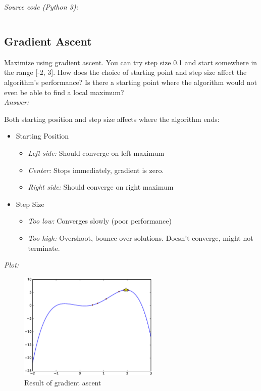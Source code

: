 \documentclass{article}           %
\newcommand\marginsymbol[1][0pt]{%
  \tabto*{0cm}\makebox[\dimexpr-1cm-#1\relax][r]{$\mathbb{P}$}\tabto*{\TabPrevPos}}
\begin{document}
\emph{Source code (Python 3):}
\inputminted{Python}{py/w1e1b.py}

\subsection{Gradient Ascent \marginsymbol}
\label{subsec:grada}
Maximize using gradient ascent. You can try step size 0.1 and start somewhere
in the range [-2, 3]. How does the choice of starting point and step size
affect the algorithm's performance? Is there a starting point where the
algorithm would not even be able to find a local maximum?\\

\emph{Answer:}

Both starting position and step size affects where the algorithm ends:
\begin{itemize}
    \item Starting Position
    \begin{itemize}
        \item \emph{Left side:} Should converge on left maximum
        \item \emph{Center:} Stops immediately, gradient is zero.
        \item \emph{Right side:} Should converge on right maximum
    \end{itemize}
    \item Step Size
    \begin{itemize}
        \item \emph{Too low:} Converges slowly (poor performance)
        \item \emph{Too high:} Overshoot, bounce over solutions. Doesn't converge, might not terminate.
    \end{itemize}
\end{itemize}

\emph{Plot:}
\begin{figure}[H]
\begin{center}
\includegraphics[width=0.6\textwidth]{eps/w1e1c.eps}
\caption{Result of gradient ascent}
\label{fig:w1e1c}
\end{center}
\end{figure}
\end{document}
